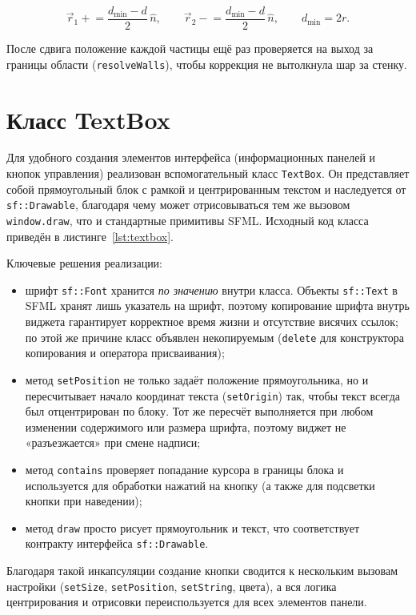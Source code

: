 \documentclass[a4paper]{article}
\newcommand{\subsectiontext}[1]{%
    \section*{\fontsize{13pt}{0pt}\selectfont\textbf{#1}}%
}
\begin{document}
\begin{equation}
    \vec{r}_1 \mathrel{+}= \frac{d_{\min} - d}{2}\,\hat{n}, \qquad
    \vec{r}_2 \mathrel{-}= \frac{d_{\min} - d}{2}\,\hat{n}, \qquad d_{\min} = 2r.
\end{equation}

После сдвига положение каждой частицы ещё раз проверяется на выход за границы области (\texttt{resolveWalls}), чтобы коррекция не вытолкнула шар за стенку.

\subsectiontext{Класс TextBox}

Для удобного создания элементов интерфейса (информационных панелей и кнопок управления) реализован вспомогательный класс \texttt{TextBox}. Он представляет собой прямоугольный блок с рамкой и центрированным текстом и наследуется от \texttt{sf::Drawable}, благодаря чему может отрисовываться тем же вызовом \texttt{window.draw}, что и стандартные примитивы SFML. Исходный код класса приведён в листинге~\ref{lst:textbox}.

Ключевые решения реализации:

\begin{itemize}
    \item шрифт \texttt{sf::Font} хранится \emph{по значению} внутри класса. Объекты \texttt{sf::Text} в SFML хранят лишь указатель на шрифт, поэтому копирование шрифта внутрь виджета гарантирует корректное время жизни и отсутствие висячих ссылок; по этой же причине класс объявлен некопируемым (\texttt{delete} для конструктора копирования и оператора присваивания);
    \item метод \texttt{setPosition} не только задаёт положение прямоугольника, но и пересчитывает начало координат текста (\texttt{setOrigin}) так, чтобы текст всегда был отцентрирован по блоку. Тот же пересчёт выполняется при любом изменении содержимого или размера шрифта, поэтому виджет не «разъезжается» при смене надписи;
    \item метод \texttt{contains} проверяет попадание курсора в границы блока и используется для обработки нажатий на кнопку (а также для подсветки кнопки при наведении);
    \item метод \texttt{draw} просто рисует прямоугольник и текст, что соответствует контракту интерфейса \texttt{sf::Drawable}.
\end{itemize}

Благодаря такой инкапсуляции создание кнопки сводится к нескольким вызовам настройки (\texttt{setSize}, \texttt{setPosition}, \texttt{setString}, цвета), а вся логика центрирования и отрисовки переиспользуется для всех элементов панели.
\end{document}
